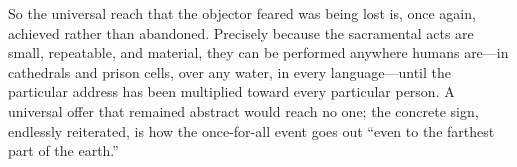 So the universal reach that the objector feared was being lost is, once again, achieved rather than abandoned. Precisely because the sacramental acts are small, repeatable, and material, they can be performed anywhere humans are---in cathedrals and prison cells, over any water, in every language---until the particular address has been multiplied toward every particular person. A universal offer that remained abstract would reach no one; the concrete sign, endlessly reiterated, is how the once-for-all event goes out ``even to the farthest part of the earth.''
